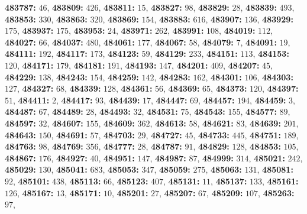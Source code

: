 \textsf{\bfseries 483787:} $46$, \textsf{\bfseries 483809:} $426$, \textsf{\bfseries 483811:} $15$, \textsf{\bfseries 483827:} $98$, \textsf{\bfseries 483829:} $28$, \textsf{\bfseries 483839:} $493$, \textsf{\bfseries 483853:} $330$, \textsf{\bfseries 483863:} $320$, \textsf{\bfseries 483869:} $154$, \textsf{\bfseries 483883:} $616$, \textsf{\bfseries 483907:} $136$, \textsf{\bfseries 483929:} $175$, \textsf{\bfseries 483937:} $175$, \textsf{\bfseries 483953:} $24$, \textsf{\bfseries 483971:} $262$, \textsf{\bfseries 483991:} $108$, \textsf{\bfseries 484019:} $112$, \textsf{\bfseries 484027:} $66$, \textsf{\bfseries 484037:} $480$, \textsf{\bfseries 484061:} $177$, \textsf{\bfseries 484067:} $58$, \textsf{\bfseries 484079:} $7$, \textsf{\bfseries 484091:} $19$, \textsf{\bfseries 484111:} $192$, \textsf{\bfseries 484117:} $173$, \textsf{\bfseries 484123:} $59$, \textsf{\bfseries 484129:} $233$, \textsf{\bfseries 484151:} $113$, \textsf{\bfseries 484153:} $120$, \textsf{\bfseries 484171:} $179$, \textsf{\bfseries 484181:} $191$, \textsf{\bfseries 484193:} $147$, \textsf{\bfseries 484201:} $409$, \textsf{\bfseries 484207:} $45$, \textsf{\bfseries 484229:} $138$, \textsf{\bfseries 484243:} $154$, \textsf{\bfseries 484259:} $142$, \textsf{\bfseries 484283:} $162$, \textsf{\bfseries 484301:} $106$, \textsf{\bfseries 484303:} $127$, \textsf{\bfseries 484327:} $68$, \textsf{\bfseries 484339:} $128$, \textsf{\bfseries 484361:} $56$, \textsf{\bfseries 484369:} $65$, \textsf{\bfseries 484373:} $120$, \textsf{\bfseries 484397:} $51$, \textsf{\bfseries 484411:} $2$, \textsf{\bfseries 484417:} $93$, \textsf{\bfseries 484439:} $17$, \textsf{\bfseries 484447:} $69$, \textsf{\bfseries 484457:} $194$, \textsf{\bfseries 484459:} $3$, \textsf{\bfseries 484487:} $67$, \textsf{\bfseries 484489:} $28$, \textsf{\bfseries 484493:} $32$, \textsf{\bfseries 484531:} $75$, \textsf{\bfseries 484543:} $155$, \textsf{\bfseries 484577:} $89$, \textsf{\bfseries 484597:} $32$, \textsf{\bfseries 484607:} $155$, \textsf{\bfseries 484609:} $362$, \textsf{\bfseries 484613:} $58$, \textsf{\bfseries 484621:} $83$, \textsf{\bfseries 484639:} $201$, \textsf{\bfseries 484643:} $150$, \textsf{\bfseries 484691:} $57$, \textsf{\bfseries 484703:} $29$, \textsf{\bfseries 484727:} $45$, \textsf{\bfseries 484733:} $445$, \textsf{\bfseries 484751:} $189$, \textsf{\bfseries 484763:} $98$, \textsf{\bfseries 484769:} $356$, \textsf{\bfseries 484777:} $28$, \textsf{\bfseries 484787:} $91$, \textsf{\bfseries 484829:} $128$, \textsf{\bfseries 484853:} $105$, \textsf{\bfseries 484867:} $176$, \textsf{\bfseries 484927:} $40$, \textsf{\bfseries 484951:} $147$, \textsf{\bfseries 484987:} $87$, \textsf{\bfseries 484999:} $314$, \textsf{\bfseries 485021:} $242$, \textsf{\bfseries 485029:} $130$, \textsf{\bfseries 485041:} $683$, \textsf{\bfseries 485053:} $347$, \textsf{\bfseries 485059:} $275$, \textsf{\bfseries 485063:} $131$, \textsf{\bfseries 485081:} $92$, \textsf{\bfseries 485101:} $438$, \textsf{\bfseries 485113:} $66$, \textsf{\bfseries 485123:} $407$, \textsf{\bfseries 485131:} $11$, \textsf{\bfseries 485137:} $133$, \textsf{\bfseries 485161:} $126$, \textsf{\bfseries 485167:} $13$, \textsf{\bfseries 485171:} $10$, \textsf{\bfseries 485201:} $27$, \textsf{\bfseries 485207:} $67$, \textsf{\bfseries 485209:} $107$, \textsf{\bfseries 485263:} $97$, 
